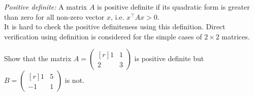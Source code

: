 \documentclass[12pt,class=book,crop=false]{standalone}
\begin{document}
\emph{Positive definite:}  A matrix $ A $ is positive definite if its quadratic form is greater than zero for all non-zero vector $ x $,  i.e. $ x^\top Ax > 0. $\\

It is hard to check the positive definiteness using this definition. Direct verification using definition is considered  for the simple cases of $ 2\times 2 $ matrices.
\begin{ex}
    Show that the matrix $ A =\begin{pmatrix*}[r]
            1 & 1\\
            2 & 3
        \end{pmatrix*} $ is positive definite but $ B = \begin{pmatrix*}[r]
            1 & 5\\
            -1 & 1
        \end{pmatrix*}$ is not.\\



\end{ex}
\end{document}
